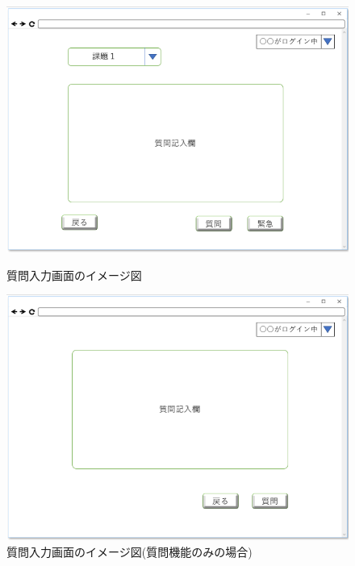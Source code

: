 \begin{figure}[htbp]
 \begin{minipage}{0.5\hsize}
  \begin{center}
   \includegraphics[width=1\linewidth,clip]{./img/36.png}
  \end{center}
  \caption{質問入力画面のイメージ図　　　　　　　　　　}\label{fig:36}
 \end{minipage}
 \begin{minipage}{0.5\hsize}
  \begin{center}
   \includegraphics[width=1\linewidth,clip]{./img/37.png}
  \end{center}
  \caption{質問入力画面のイメージ図(質問機能のみの場合)}\label{fig:37}
 \end{minipage}
\end{figure}

\newpage
